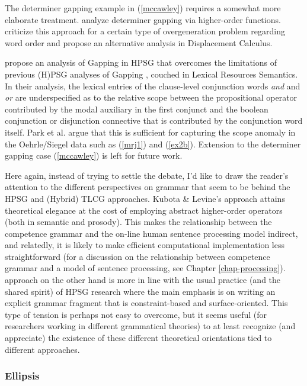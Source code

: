 \documentclass[output=paper]{langsci/langscibook}
\begin{document}
The determiner gapping example in (\ref{mccawley}) requires a somewhat more
elaborate treatment. \citet{kubota-levine-gapping} analyze determiner
gapping via higher-order functions. \citet{morrillvalentin16} criticize this
approach for a certain type of overgeneration problem regarding word
order and propose an alternative analysis in Displacement Calculus.

\citet{parkea18gapping} propose an analysis of Gapping in HPSG that
overcomes the limitations of previous (H)PSG analyses of Gapping
\citep{sgww,chaves05,abeille-ea}, couched in Lexical Resources Semantics.
In their analysis, the lexical entries of the clause-level conjunction
words \textit{and} and \textit{or} are underspecified as to the relative scope
between the propositional operator contributed by the modal auxiliary
in the first conjunct and the boolean conjunction or disjunction
connective that is contributed by the conjunction word itself. Park et
al. argue that this is sufficient for capturing the scope anomaly in the
Oehrle/Siegel data such as (\ref{mrj1}) and (\ref{ex2b}). Extension to
the determiner gapping case (\ref{mccawley}) is left for future work.

Here again, instead of trying to settle the debate, I'd like to draw
the reader's attention to the different perspectives on grammar that
seem to be behind the HPSG and (Hybrid) TLCG approaches. Kubota \&
Levine's approach attains theoretical elegance at the cost of
employing abstract higher-order operators (both in semantic and
prosody). This makes the relationship between the competence grammar
and the on-line human sentence processing model indirect, and
relatedly, it is likely to make efficient computational implementation
less straightforward (for a discussion on the relationship between
competence grammar and a model of sentence processing, see Chapter
\ref{chap-processing}).  approach on the
other hand is more in line with the usual practice (and the shared
spirit) of HPSG research where the main emphasis is on writing an
explicit grammar fragment that is constraint-based and
surface-oriented. This type of tension is perhaps not easy to
overcome, but it seems useful (for researchers working in different
grammatical theories) to at least recognize (and appreciate) the
existence of these different theoretical orientations tied to
different approaches.



\subsubsection{Ellipsis}
\end{document}
